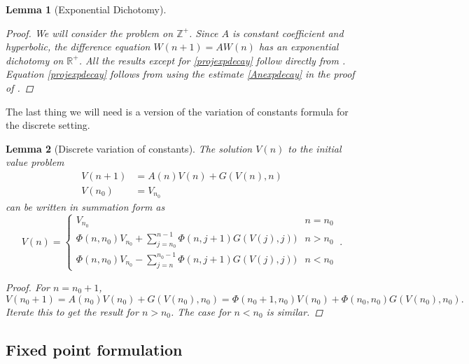 \documentclass[12pt]{elsarticle}
\def\R{{\mathbb R}}
\def\Z{{\mathbb Z}}
\newtheorem{lemma}{Lemma}
\begin{document}
\begin{lemma}[Exponential Dichotomy]
\begin{proof}
We will consider the problem on $\Z^+$. Since $A$ is constant coefficient and hyperbolic, the difference equation $W(n+1) = A  W(n)$ has an exponential dichotomy on $\R^+$. All the results except for \cref{projexpdecay} follow directly from \cite[Proposition 2.5]{Beyn1997}. Equation \cref{projexpdecay} follows from using the estimate \cref{Anexpdecay} in the proof of \cite[Proposition 2.5]{Beyn1997}.
\end{proof}
\end{lemma}

The last thing we will need is a version of the variation of constants formula for the discrete setting.

\begin{lemma}[Discrete variation of constants]\label{VOC}
The solution $V(n)$ to the initial value problem
\begin{equation*}
\begin{aligned}
V(n+1) &= A(n) V(n) + G(V(n), n) \\
V(n_0) &= V_{n_0}
\end{aligned}
\end{equation*}
can be written in summation form as 
\begin{equation}\label{VOCformula}
V(n) = 
\begin{cases}
V_{n_0} & n = n_0 \\
\Phi(n, n_0) V_{n_0} + \sum_{j = n_0}^{n-1} \Phi(n, j+1) G(V(j), j)) & n > n_0 \\
\Phi(n, n_0) V_{n_0} - \sum_{j = n}^{n_0-1} \Phi(n, j+1) G(V(j), j)) & n < n_0 
\end{cases}\:.
\end{equation}
\begin{proof}
For $n = n_0 + 1$,
\[
V(n_0 + 1) = A(n_0) V(n_0) + G(V(n_0), n_0) = \Phi(n_0+1, n_0) V(n_0) + \Phi(n_0, n_0) G(V(n_0), n_0).
\]
Iterate this to get the result for $n > n_0$. The case for $n < n_0$ is similar.
\end{proof}
\end{lemma}

\subsection{Fixed point formulation}
\end{document}
